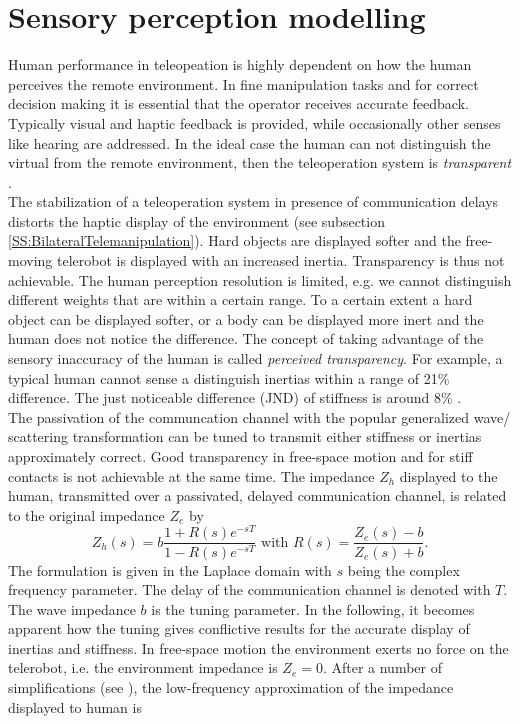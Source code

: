 \documentclass[a4paper,twoside, openright,12pt]{report}
\begin{document}
\section{Sensory perception modelling}
Human performance in teleopeation is highly dependent on how the human perceives the remote environment. In fine manipulation tasks and for correct decision making it is essential that the operator receives accurate feedback. Typically visual and haptic feedback is provided, while occasionally other senses like hearing are addressed. In the ideal case the human can not distinguish the virtual from the remote environment, then the teleoperation system is \emph{transparent} \cite{Hirche2012}.\\
The stabilization of a teleoperation system in presence of communication delays distorts the haptic display of the environment (see subsection \ref{SS:BilateralTelemanipulation}). Hard objects are displayed softer and the free-moving telerobot is displayed with an increased inertia. Transparency is thus not achievable. The human perception resolution is limited, e.g. we cannot distinguish different weights that are within a certain range. To a certain extent a hard object can be displayed softer, or a body can be displayed more inert and the human does not notice the difference. The concept of taking advantage of the sensory inaccuracy of the human is called \emph{perceived transparency}.
For example, a typical human cannot sense a distinguish inertias within a range of 21\% difference. The just noticeable difference (JND) of stiffness is around 8\% \cite{Hirche2012}.\\
The passivation of the communcation channel with the popular generalized wave/ scattering transformation \cite{Niemeyer2004} can be tuned to transmit either stiffness or inertias  approximately correct. Good transparency in free-space motion and for stiff contacts is not achievable at the same time. The impedance $Z_h$ displayed to the human, transmitted over a passivated, delayed communication channel, is related to the original impedance $Z_e$ by
\begin{equation}
Z_h (s) = b \frac{1+R(s)e^{-sT}}{1-R(s) e^{-sT}} \text{  with  } R(s) = \frac{Z_e(s) - b}{Z_e(s)+b}.
\end{equation}
The formulation is given in the Laplace domain with $s$ being the complex frequency parameter. The delay of the communication channel is denoted with $T$. The wave impedance $b$ is the tuning parameter. In the following, it becomes apparent how the tuning gives conflictive results for the accurate display of inertias and stiffness. In free-space motion the environment exerts no force on the telerobot, i.e. the environment impedance is $Z_e=0$.  After a number of simplifications (see \cite{Hirche2012}), the low-frequency approximation of the impedance displayed to human is
\end{document}
